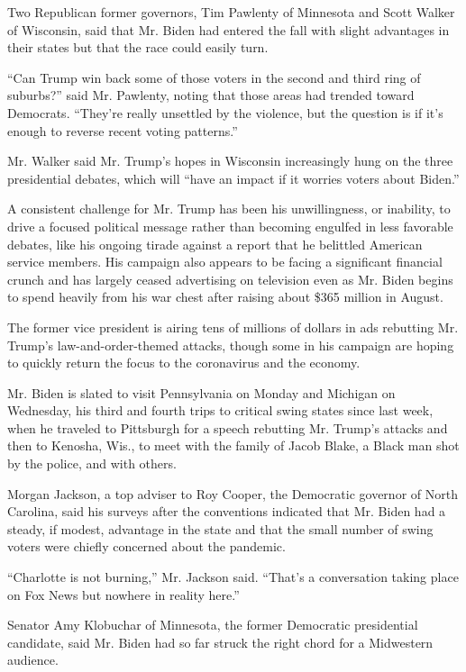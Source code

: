 Two Republican former governors, Tim Pawlenty of Minnesota and Scott
Walker of Wisconsin, said that Mr. Biden had entered the fall with
slight advantages in their states but that the race could easily turn.

``Can Trump win back some of those voters in the second and third ring
of suburbs?'' said Mr. Pawlenty, noting that those areas had trended
toward Democrats. ``They're really unsettled by the violence, but the
question is if it's enough to reverse recent voting patterns.''

Mr. Walker said Mr. Trump's hopes in Wisconsin increasingly hung on the
three presidential debates, which will ``have an impact if it worries
voters about Biden.''

A consistent challenge for Mr. Trump has been his unwillingness, or
inability, to drive a focused political message rather than becoming
engulfed in less favorable debates, like his ongoing tirade against a
report that he belittled American service members. His campaign also
appears to be facing a significant financial crunch and has largely
ceased advertising on television even as Mr. Biden begins to spend
heavily from his war chest after raising about \$365 million in August.

The former vice president is airing tens of millions of dollars in ads
rebutting Mr. Trump's law-and-order-themed attacks, though some in his
campaign are hoping to quickly return the focus to the coronavirus and
the economy.

Mr. Biden is slated to visit Pennsylvania on Monday and Michigan on
Wednesday, his third and fourth trips to critical swing states since
last week, when he traveled to Pittsburgh for a speech rebutting Mr.
Trump's attacks and then to Kenosha, Wis., to meet with the family of
Jacob Blake, a Black man shot by the police, and with others.

Morgan Jackson, a top adviser to Roy Cooper, the Democratic governor of
North Carolina, said his surveys after the conventions indicated that
Mr. Biden had a steady, if modest, advantage in the state and that the
small number of swing voters were chiefly concerned about the pandemic.

``Charlotte is not burning,'' Mr. Jackson said. ``That's a conversation
taking place on Fox News but nowhere in reality here.''

Senator Amy Klobuchar of Minnesota, the former Democratic presidential
candidate, said Mr. Biden had so far struck the right chord for a
Midwestern audience.

